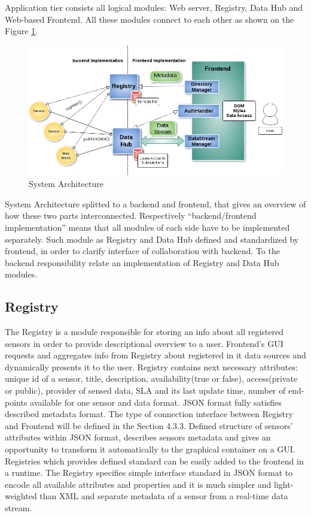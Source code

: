   Application tier consists all logical modules: Web server, Registry, Data Hub and Web-based Frontend. All these modules connect to each other as shown on the Figure \ref{img:structure}. 
    \begin{figure}[!ht]
    \centering
    \includegraphics[scale=0.6]{images/Structure.png}   
    \caption[System Architecture]{System Architecture} 
    \label{img:structure}                        
    \end{figure}

    System Architecture splitted to a backend and frontend, that gives an overview of how these two parts interconnected. Respectively ``backend/frontend implementation'' means that all modules of each side have to be implemented separately. Such module as Registry and Data Hub defined and standardized by frontend, in order to clarify interface of collaboration with backend. To the backend responsibility relate an implementation of Registry and Data Hub modules.

  \subsection{Registry}
    The Registry is a module responsible for storing an info about all registered sensors in order to provide descriptional overview to a user. Frontend's GUI requests and aggregates info from Registry about registered in it data sources and dynamically presents it to the user. Registry contains next necessary attributes: unique id of a sensor, title, description, availability(true or false), access(private or public), provider of sensed data, SLA and its last update time, number of end-points available for one sensor and data format. JSON format fully satisfies described metadata format. The type of connection interface between Registry and Frontend will be defined in the Section 4.3.3. Defined structure of sensors' attributes within JSON format, describes sensors metadata and gives an opportunity to transform it automatically to the graphical container on a GUI. Registries which provides defined standard can be easily added to the frontend in a runtime. The Registry specifies simple interface standard in JSON format to encode all available attributes and properties and it is much simpler and light-weighted than XML and separate metadata of a sensor from a real-time data stream. 

